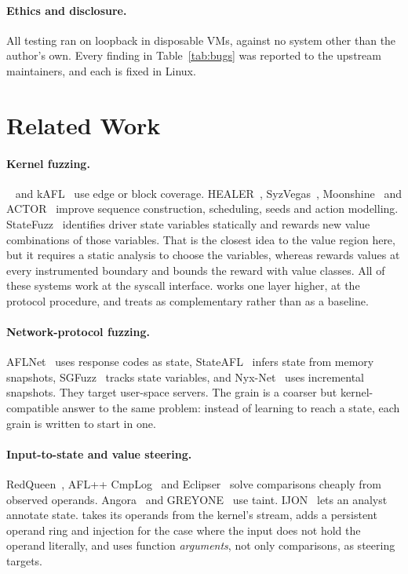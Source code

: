 \documentclass{article}
\begin{document}
\paragraph{Ethics and disclosure.} All testing ran on loopback in disposable
VMs, against no system other than the author's own. Every finding in
Table~\ref{tab:bugs} was reported to the upstream maintainers, and each is
fixed in Linux.


\section{Related Work}\label{sec:related}

\paragraph{Kernel fuzzing.} \syzkaller~\cite{vyukov2015syzkaller} and
kAFL~\cite{schumilo2017kafl} use edge or block coverage. HEALER~\cite{sun2021healer},
SyzVegas~\cite{wang2021syzvegas}, Moonshine~\cite{pailoor2018moonshine} and
ACTOR~\cite{fleischer2023actor} improve sequence construction, scheduling,
seeds and action modelling. StateFuzz~\cite{zhao2022statefuzz} identifies
driver state variables statically and rewards new value combinations of
those variables. That is the closest idea to the value region here, but it
requires a static analysis to choose the variables, whereas \toolname rewards
values at every instrumented boundary and bounds the reward with value
classes. All of these systems work at the syscall interface. \toolname works
one layer higher, at the protocol procedure, and treats \syzkaller as
complementary rather than as a baseline.

\paragraph{Network-protocol fuzzing.} AFLNet~\cite{pham2020aflnet} uses
response codes as state, StateAFL~\cite{natella2022stateafl} infers state from
memory snapshots, SGFuzz~\cite{ba2022sgfuzz} tracks state variables, and
Nyx-Net~\cite{schumilo2022nyxnet} uses incremental snapshots. They target
user-space servers. The grain is a coarser but kernel-compatible answer to the
same problem: instead of learning to reach a state, each grain is written to
start in one.

\paragraph{Input-to-state and value steering.} RedQueen~\cite{aschermann2019redqueen},
AFL++ CmpLog~\cite{fioraldi2020aflpp} and Eclipser~\cite{choi2019eclipser}
solve comparisons cheaply from observed operands. Angora~\cite{chen2018angora}
and GREYONE~\cite{gan2020greyone} use taint. IJON~\cite{aschermann2020ijon}
lets an analyst annotate state. \toolname takes its operands from the
kernel's \tracecmp stream, adds a persistent operand ring and injection for
the case where the input does not hold the operand literally, and uses
function \emph{arguments}, not only comparisons, as steering targets.
\end{document}
